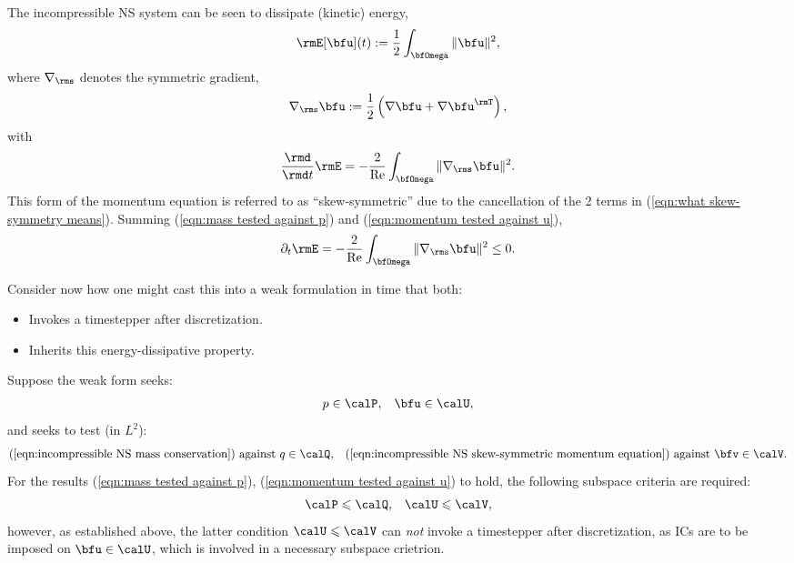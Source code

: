     The incompressible NS system can be seen to dissipate (kinetic) energy,
    \begin{equation}\label{eqn:incompressible NS energy definition}
        \rmE[\bfu](t)  :=  \frac{1}{2}\int_{\bfOmega}\|\bfu\|^{2},
    \end{equation}
    where $\nabla_{\rms}$ denotes the symmetric gradient,
    \begin{equation}
        \nabla_{\rms}\bfu  :=  \frac{1}{2}\left(\nabla\bfu + \nabla\bfu^{\rmT}\right),
    \end{equation}
    with
    \begin{equation}
        \frac{\rmd}{\rmd t}\rmE  =  - \frac{2}{\rmRe}\int_{\bfOmega}\|\nabla_{\rms}\bfu\|^{2}.
    \end{equation}
    This form of the momentum equation is referred to as ``skew-symmetric'' due to the cancellation of the 2 terms in (\ref{eqn:what skew-symmetry means}). Summing (\ref{eqn:mass tested against p}) and (\ref{eqn:momentum tested against u}),
    \begin{equation}
        \partial_{t}\rmE  =  - \frac{2}{\rmRe}\int_{\bfOmega}\|\nabla_{\rms}\bfu\|^{2}  \leq  0.
    \end{equation}

    Consider now how one might cast this into a weak formulation in time that both:
    \begin{itemize}
        \item  Invokes a timestepper after discretization.
        \item  Inherits this energy-dissipative property.
    \end{itemize}
    Suppose the weak form seeks:
    \begin{align}
           p  \in  \calP,  &&
        \bfu  \in  \calU,
    \end{align}
    and seeks to test (in $L^{2}$):
    \begin{align}
                           \text{(\ref{eqn:incompressible NS mass conservation}) against }    q \in \calQ,  &&
        \text{(\ref{eqn:incompressible NS skew-symmetric momentum equation}) against } \bfv \in \calV.
    \end{align}
    For the results (\ref{eqn:mass tested against p}), (\ref{eqn:momentum tested against u}) to hold, the following subspace criteria are required:
    \begin{align}
        \calP  \leqslant  \calQ,  &&
        \calU  \leqslant  \calV,
    \end{align}
    however, as established above, the latter condition $\calU  \leqslant  \calV$ can \emph{not} invoke a timestepper after discretization, as ICs are to be imposed on $\bfu  \in  \calU$, which is involved in a necessary subspace crietrion. \contra
    
